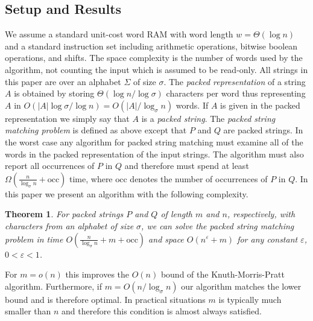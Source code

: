 \documentclass{article}
\newcommand{\occ}{\ensuremath{\mathrm{occ}}}
\newtheorem{theorem}{Theorem}
\begin{document}
\subsection{Setup and Results}
We assume a standard unit-cost word RAM with word length $w =
\Theta(\log n)$ and a standard instruction set including arithmetic
operations, bitwise boolean operations, and shifts. The space
complexity is the number of words used by the algorithm, not counting
the input which is assumed to be read-only. All strings in this paper
are over an alphabet $\Sigma$ of size $\sigma$. The \emph{packed
  representation} of a string $A$ is obtained by storing $\Theta(\log
n/\log \sigma)$ characters per word thus representing $A$ in
$O(|A|\log \sigma/\log n) = O(|A|/\log_\sigma n)$ words. If $A$ is
given in the packed representation we simply say that $A$ is a
\emph{packed string}. The \emph{packed string matching problem} is
defined as above except that $P$ and $Q$ are packed strings. In the
worst case any algorithm for packed string matching must examine all
of the words in the packed representation of the input strings. The
algorithm must also report all occurrences of $P$ in $Q$ and therefore
must spend at least $\Omega\left(\frac{n}{\log_\sigma n} +
  \occ\right)$ time, where $\occ$ denotes the number of occurrences of
$P$ in $Q$. In this paper we present an algorithm with the following
complexity.
\begin{theorem}\label{thm:main}
For packed strings $P$ and $Q$ of length $m$ and $n$, respectively,
with characters from an alphabet of size $\sigma$, we can solve the
packed string matching problem in time $O\left(\frac{n}{\log_\sigma n}
  + m + \occ\right)$ and space $O(n^{\varepsilon} + m)$ for any
constant $\varepsilon$, $0 < \varepsilon < 1$.  
\end{theorem}
For $m = o(n)$ this improves the $O(n)$ bound of the
Knuth-Morris-Pratt algorithm. Furthermore, if $m = O(n/\log_\sigma n)$
our algorithm matches the lower bound and is therefore optimal. In
practical situations $m$ is typically much smaller than $n$ and
therefore this condition is almost always satisfied.
\end{document}
